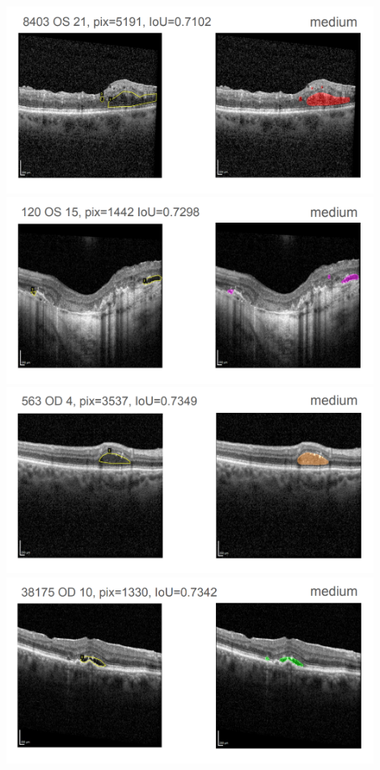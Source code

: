 \includegraphics[width=0.9\textwidth]{./pic/Segmentierung/Segmentierungsergebnisse/25.PNG}
\includegraphics[width=0.9\textwidth]{./pic/Segmentierung/Segmentierungsergebnisse/26.PNG}
\includegraphics[width=0.9\textwidth]{./pic/Segmentierung/Segmentierungsergebnisse/27.PNG}
\includegraphics[width=0.9\textwidth]{./pic/Segmentierung/Segmentierungsergebnisse/28.PNG}
